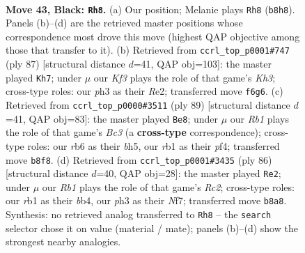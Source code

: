 \documentclass[11pt]{article}
\begin{document}
\clearpage

\begin{figure}[p]\centering
\begin{subfigure}{0.46\textwidth}\centering
\resizebox{\linewidth}{!}{%
\newchessgame
\chessboard[
  setfen={1r6/1p3p2/pR2pk2/8/P3PK2/5P1P/7P/1R6 b - - 16 43},
  showmover=false,
  pgfstyle=straightmove, color=movearrow, markmove={b8-h8}
]}
\caption{}
\end{subfigure}\hfill
\begin{subfigure}{0.46\textwidth}\centering
\resizebox{\linewidth}{!}{%
\newchessgame
\chessboard[
  setfen={8/6r1/1R3Rpk/P4p1p/5P1K/4p1PP/4r3/8 b - - 3 44},
  showmover=false,
  pgfstyle=straightmove, color=movearrow, markmove={h6-h7}
]}
\caption{}
\end{subfigure}
\\[4pt]
\begin{subfigure}{0.46\textwidth}\centering
\resizebox{\linewidth}{!}{%
\newchessgame
\chessboard[
  setfen={5k2/p4p2/P1b5/r2p1R1B/2p2P2/2P5/1PK5/8 b - - 10 45},
  showmover=false,
  pgfstyle=straightmove, color=movearrow, markmove={c6-e8}
]}
\caption{}
\end{subfigure}\hfill
\begin{subfigure}{0.46\textwidth}\centering
\resizebox{\linewidth}{!}{%
\newchessgame
\chessboard[
  setfen={8/p4N2/6p1/5k1p/1b5P/r5PK/P1R2P2/8 w - - 12 44},
  showmover=false,
  pgfstyle=straightmove, color=movearrow, markmove={c2-e2}
]}
\caption{}
\end{subfigure}
\caption{\textbf{Move 43, Black: \texttt{Rh8}.} (a) Our position; Melanie plays \texttt{Rh8} (\texttt{b8h8}). Panels (b)--(d) are the retrieved master positions whose correspondence most drove this move (highest QAP objective among those that transfer to it). (b) Retrieved from \texttt{ccrl\_top\_p0001\#747} (ply 87) [structural distance $d$=41, QAP obj=103]: the master played \texttt{Kh7}; under $\mu$ our \emph{Kf3} plays the role of that game's \emph{Kh3}; cross-type roles: our \emph{p}h3 as their \emph{R}e2; transferred move \texttt{f6g6}. (c) Retrieved from \texttt{ccrl\_top\_p0000\#3511} (ply 89) [structural distance $d$=41, QAP obj=83]: the master played \texttt{Be8}; under $\mu$ our \emph{Rb1} plays the role of that game's \emph{Bc3} (a \textbf{cross-type} correspondence); cross-type roles: our \emph{r}b6 as their \emph{b}h5, our \emph{r}b1 as their \emph{p}f4; transferred move \texttt{b8f8}. (d) Retrieved from \texttt{ccrl\_top\_p0001\#3435} (ply 86) [structural distance $d$=40, QAP obj=28]: the master played \texttt{Re2}; under $\mu$ our \emph{Rb1} plays the role of that game's \emph{Rc2}; cross-type roles: our \emph{r}b1 as their \emph{b}b4, our \emph{p}h3 as their \emph{N}f7; transferred move \texttt{b8a8}. Synthesis: no retrieved analog transferred to \texttt{Rh8} -- the \texttt{search} selector chose it on value (material / mate); panels (b)--(d) show the strongest nearby analogies.}
\label{fig:thought-m85}
\end{figure}
\end{document}
